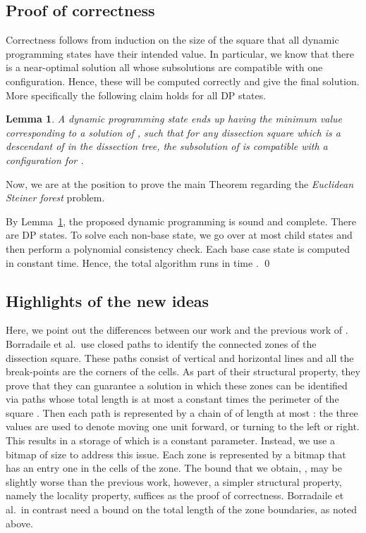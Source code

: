 \documentclass[extras,11pt]{article} \usepackage{fullpage}
\theoremstyle{mytheorem}
\newtheorem{lemma}[theorem]{Lemma}
\newenvironment{proofof}[1]{\par\noindent{\bf #1.}\hspace{0.5em}}
    {\hfill\qed\vspace{1ex}}
\newcommand{\prob}[1]{\textit{#1}}
\begin{document}
\subsection{Proof of correctness}
Correctness follows from induction on the size of the square  that all dynamic programming states have their intended value.
In particular, we know that there is a near-optimal solution all whose subsolutions are compatible with one configuration.
Hence, these will be computed correctly and give the final solution.
More specifically the following claim holds for all DP states.
\begin{lemma}\label{lem:dp-sf}
A dynamic programming state  ends up having the minimum value corresponding to a solution  of , such that for any dissection square  which is a descendant of  in the dissection tree, the subsolution  of  is compatible with a configuration  for .
\end{lemma}



Now, we are at the position to prove the main Theorem regarding the \prob{Euclidean Steiner forest} problem.
\begin{proofof}{\proofname\ of Theorem~\ref{thm:sf}}
By Lemma~\ref{lem:dp-sf}, the proposed dynamic programming is sound and complete.
There are  DP states.
To solve each non-base state, we go over at most  child states and then perform a polynomial consistency check.
Each base case state is computed in constant time.
Hence, the total algorithm runs in time .
\end{proofof}







\subsection{Highlights of the new ideas}\label{sec:newideas}
Here, we point out the differences between our work and the previous work of \cite{BKM08:euc-for}.
Borradaile et al.\ use closed paths to identify the connected zones of the dissection square.
These paths consist of vertical and horizontal lines and all the break-points are the corners of the cells.
As part of their structural property, they prove that they can guarantee a solution in which these zones can be identified via paths whose total length is at most a constant  times the perimeter of the square .
Then each path is represented by a chain of  of length at most : the three values are used to denote moving one unit forward, or turning to the left or right.  This results in a storage of  which is a constant parameter.
Instead, we use a bitmap of size  to address this issue.
Each zone is represented by a bitmap that has an entry one in the cells of the zone.
The bound that we obtain, , may be slightly worse than the previous work, however,
a simpler structural property, namely the locality property, suffices as the proof of correctness.
Borradaile et al.\ in contrast need a bound on the total length of the zone boundaries, as noted above.
\end{document}
